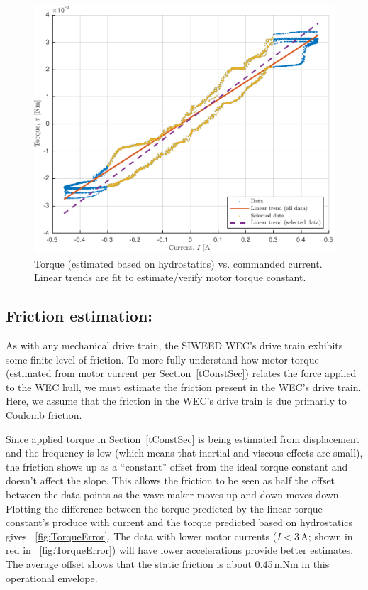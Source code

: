 \documentclass[hardware,article,submit,pdftex,moreauthors]{Definitions/mdpi}
\begin{document}
\begin{figure}[tb]
  \centering
  \includegraphics[width=1\textwidth]{diagrams/findKT_3.pdf}
  \caption{Torque (estimated based on hydrostatics) vs. commanded current. Linear trends are fit to estimate/verify motor torque constant.}
  \label{fig:TorqueConstant}
\end{figure}


\subsection{Friction estimation:}\label{friction}
As with any mechanical drive train, the SIWEED WEC's drive train exhibits some finite level of friction.
To more fully understand how motor torque (estimated from motor current per Section~\ref{tConstSec}) relates the force applied to the WEC hull, we must estimate the friction present in the WEC's drive train.
Here, we assume that the friction in the WEC's drive train is due primarily to Coulomb friction.

Since applied torque in Section~\ref{tConstSec} is being estimated from displacement and the frequency is low (which means that inertial and viscous effects are small), the friction shows up as a ``constant'' offset from the ideal torque constant and doesn't affect the slope.
This allows the friction to be seen as half the offset between the data points as the wave maker moves up and down moves down. 
Plotting the difference between the torque predicted by the linear torque constant's produce with current and the torque predicted based on hydrostatics gives \figurename~\ref{fig:TorqueError}.
The data with lower motor currents ($I < 3$\,A; shown in red in \figurename~\ref{fig:TorqueError}) will have lower accelerations provide better estimates.
The average offset shows that the static friction is about 0.45\,mNm in this operational envelope.
\end{document}
